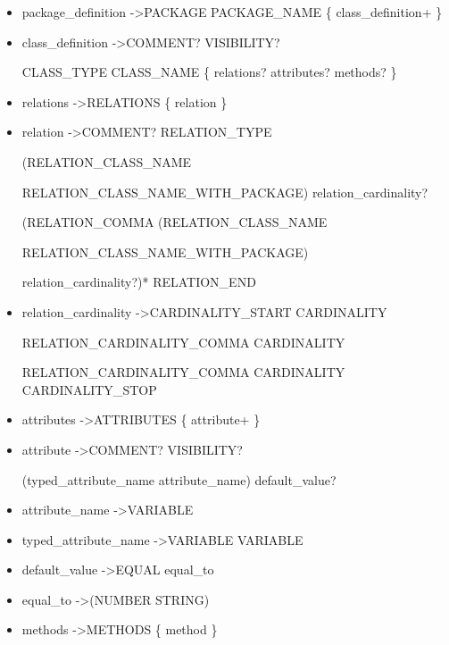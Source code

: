 \begin{itemize}
 \item package{\_}definition   -\textgreater   PACKAGE  PACKAGE{\_}NAME  \{  class{\_}definition+  \}

 \item class{\_}definition   -\textgreater   COMMENT?  VISIBILITY?  
 
 CLASS{\_}TYPE  CLASS{\_}NAME  \{  relations?  attributes?  methods?  \}

 \item relations   -\textgreater   RELATIONS  \{  relation  \}

 \item relation   -\textgreater   COMMENT?  RELATION{\_}TYPE  
 
 (RELATION{\_}CLASS{\_}NAME 
 
 \textbar RELATION{\_}CLASS{\_}NAME{\_}WITH{\_}PACKAGE)  relation{\_}cardinality?  
 
 (RELATION{\_}COMMA  (RELATION{\_}CLASS{\_}NAME 
 
 \textbar RELATION{\_}CLASS{\_}NAME{\_}WITH{\_}PACKAGE)  
 
 relation{\_}cardinality?)*  RELATION{\_}END

 \item relation{\_}cardinality   -\textgreater   CARDINALITY{\_}START  CARDINALITY  
 
 RELATION{\_}CARDINALITY{\_}COMMA   CARDINALITY 
 
 RELATION{\_}CARDINALITY{\_}COMMA  CARDINALITY  CARDINALITY{\_}STOP

 \item attributes   -\textgreater   ATTRIBUTES  \{  attribute+  \}

 \item attribute   -\textgreater   COMMENT?  VISIBILITY?  
 
 (typed{\_}attribute{\_}name \textbar attribute{\_}name)  default{\_}value?

 \item attribute{\_}name   -\textgreater   VARIABLE

 \item typed{\_}attribute{\_}name   -\textgreater   VARIABLE  VARIABLE

 \item default{\_}value   -\textgreater   EQUAL  equal{\_}to

 \item equal{\_}to   -\textgreater   (NUMBER \textbar STRING)

 \item methods   -\textgreater   METHODS  \{  method  \}


\end{itemize}
